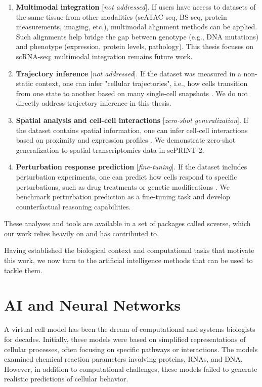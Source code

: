\begin{enumerate}
 \item \textbf{Multimodal integration} [\textit{not addressed}]. If users have access to datasets of the same tissue from other modalities (\gls{scATAC-seq}, \gls{BS-seq}, protein measurements, imaging, etc.), multimodal alignment methods can be applied. Such alignments help bridge the gap between genotype (e.g., \gls{DNA} mutations) and phenotype (expression, protein levels, pathology). This thesis focuses on scRNA-seq; multimodal integration remains future work.

 \item \textbf{Trajectory inference} [\textit{not addressed}]. If the dataset was measured in a non-static context, one can infer "cellular trajectories", i.e., how cells transition from one state to another based on many single-cell snapshots \cite{chenSTREAMSinglecellTrajectories2018}. We do not directly address trajectory inference in this thesis.

 \item \textbf{Spatial analysis and cell-cell interactions} [\textit{zero-shot generalization}]. If the dataset contains spatial information, one can infer cell-cell interactions based on proximity and expression profiles \cite{pallaSquidpyScalableFramework2022}. We demonstrate zero-shot generalization to spatial transcriptomics data in scPRINT-2.

 \item \textbf{Perturbation response prediction} [\textit{fine-tuning}]. If the dataset includes perturbation experiments, one can predict how cells respond to specific perturbations, such as drug treatments or genetic modifications \cite{lotfollahiScGenPredictsSinglecell2019}. We benchmark perturbation prediction as a fine-tuning task and develop counterfactual reasoning capabilities.
\end{enumerate}

These analyses and tools are available in a set of packages called scverse, which our work relies heavily on and has contributed to.

Having established the biological context and computational tasks that motivate this work, we now turn to the artificial intelligence methods that can be used to tackle them.

\section{AI and Neural Networks}

A virtual cell model has been the dream of computational and systems biologists for decades. Initially, these models were based on simplified representations of cellular processes, often focusing on specific pathways or interactions. The models examined chemical reaction parameters involving proteins, \gls{RNA}s, and \gls{DNA}. However, in addition to computational challenges, these models failed to generate realistic predictions of cellular behavior.

